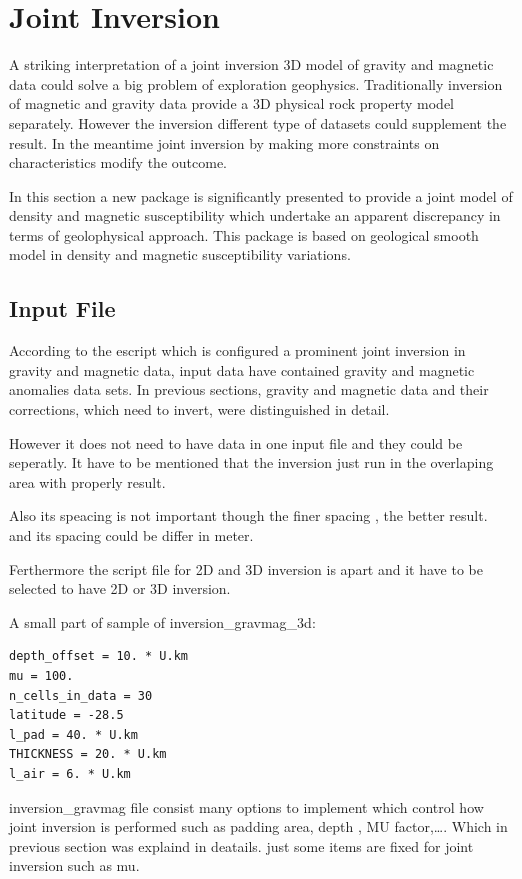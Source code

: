 \chapter{Joint Inversion}\label{Chp:cook:joint inversion}


A striking interpretation of a joint inversion 3D model of gravity and magnetic data could solve a big problem of exploration geophysics. Traditionally inversion of magnetic and gravity data provide a 3D physical rock property model separately. However the inversion different type of datasets could supplement the result. In the meantime joint inversion by making more constraints on characteristics modify the outcome.

In this section a new package is significantly presented to provide a joint model of density and magnetic susceptibility which undertake an apparent discrepancy in terms of geolophysical approach. This package is based on geological smooth model in density and magnetic susceptibility variations.



\section{Input File} 

According to the escript which is configured a prominent joint inversion in gravity and magnetic data, input data have contained gravity and magnetic anomalies data sets. In previous sections, gravity and magnetic data and their corrections, which need to invert, were distinguished in detail.

However it does not need to have data in one input file and they could be seperatly. It have to be mentioned that the inversion just run in the overlaping area with properly result.

Also its speacing is not important though the finer spacing , the better result. and its spacing could be differ in meter. 

Ferthermore the script file for 2D and 3D inversion is apart and it have to be selected to have 2D or 3D inversion.

A small part of sample of inversion_gravmag_3d:

\begin{verbatim}
depth_offset = 10. * U.km
mu = 100.
n_cells_in_data = 30
latitude = -28.5
l_pad = 40. * U.km
THICKNESS = 20. * U.km
l_air = 6. * U.km
\end{verbatim}

inversion_gravmag file consist many options to implement which control how joint inversion is performed such as padding area, depth , MU factor,\ldots. Which in previous section was explaind in deatails. just some items are fixed for joint inversion such as mu.


